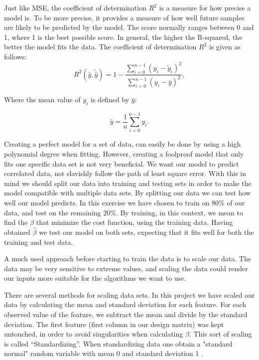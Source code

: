 \documentclass[a4paper, UKenglish, 11pt]{uiomaster}
\begin{document}
Just like MSE, the coefficient of determination $R^2$ is a measure for how precise a model is. To be more precise, it provides a measure of how well future samples are likely to be predicted by the model. The score normally ranges between 0 and 1, where 1 is the best possible score. In general, the higher the R-squared, the better the model fits the data. The coefficient of determination $R^2$ is given as follows:
\begin{equation}
R^2(\hat{y}, \tilde{\hat{y}}) = 1 - \frac{\sum_{i=0}^{n - 1} (y_i - \tilde{y}_i)^2}{\sum_{i=0}^{n - 1} (y_i - \bar{y})^2},
\label{eq:R2}
\end{equation}

Where the mean value of $y_i$ is defined by $\bar{y}$:

\begin{equation*}
\bar{y} =  \frac{1}{n} \sum_{i=0}^{n - 1} y_i.
\label{eq:ybar}
\end{equation*}

Creating a perfect model for a set of data, can easily be done by using a high polynomial degree when fitting. However, creating a foolproof model that only fits one specific data set is not very beneficial. We want our model to predict correlated data, not slavishly follow the path of least square error. With this in mind we should split our data into training and testing sets in order to make the model compatible with multiple data sets. By splitting our data we can test how well our model predicts. In this exercise we have chosen to train on $80\%$ of our data, and test on the remaining $20\%$. By training, in this context, we mean to find the $\beta$ that minimize the cost function, using the training data. Having obtained $\hat{\beta}$ we test our model on both sets, expecting that it fits well for both the training and test data.

A much used approach before starting to train the data is to scale our data. The data may be very sensitive to extreme values, and scaling the data could render our inputs more suitable for the algorithms we want to use.

There are several methods for scaling data sets. In this project we have scaled our data by calculating the mean and standard deviation for each feature. For each observed value of the feature, we subtract the mean and divide by the standard deviation. The first feature (first column in our design matrix) was kept untouched, in order to avoid singularities when calculating $\beta$. This sort of scaling is called “Standardizing”. When standardizing data one obtain a "standard normal" random variable with mean 0 and standard deviation 1 \cite{96}.
\end{document}
